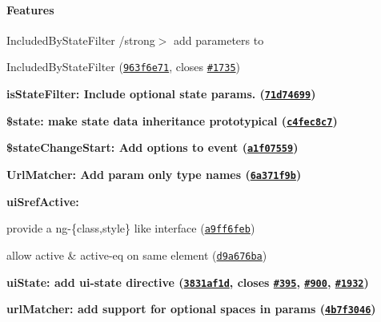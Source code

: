 {\bfseries {\bfseries \paragraph*{Features}}}

{\bfseries {\bfseries }}

{\bfseries {\bfseries 
\begin{DoxyItemize}
\item {\bfseries \begin{DoxyParagraph}{Included\+By\+State\+Filter}
/strong$>$ add parameters to 
\end{DoxyParagraph}
Included\+By\+State\+Filter (\href{https://github.com/angular-ui/ui-router/commit/963f6e71633b9c3a266f3991d79089b7d14786b4}{\tt 963f6e71}, closes \href{https://github.com/angular-ui/ui-router/issues/1735}{\tt \#1735})}
\item {\bfseries {\bfseries is\+State\+Filter\+:} Include optional state params. (\href{https://github.com/angular-ui/ui-router/commit/71d7469987ee9ca86a41c8c6393ccd5d8913c3d6}{\tt 71d74699})}
\item {\bfseries {\bfseries \$state\+:} make state data inheritance prototypical (\href{https://github.com/angular-ui/ui-router/commit/c4fec8c7998113902af4152d716c42dada6eb465}{\tt c4fec8c7})}
\item {\bfseries {\bfseries \$state\+Change\+Start\+:} Add options to event (\href{https://github.com/angular-ui/ui-router/commit/a1f07559ec74e10ff80bc4be81f287e3772b8fcb}{\tt a1f07559})}
\item {\bfseries {\bfseries Url\+Matcher\+:} Add param only type names (\href{https://github.com/angular-ui/ui-router/commit/6a371f9b70e37a82eb324122879e4473c3f6d526}{\tt 6a371f9b})}
\item {\bfseries {\bfseries ui\+Sref\+Active\+:}
\begin{DoxyItemize}
\item provide a ng-\/\{class,style\} like interface (\href{https://github.com/angular-ui/ui-router/commit/a9ff6febb469e0d5cd49054216c4472df7a6259d}{\tt a9ff6feb})
\item allow active \& active-\/eq on same element (\href{https://github.com/angular-ui/ui-router/commit/d9a676ba2c4d9e954be224c60496bcb38f6074e3}{\tt d9a676ba})
\end{DoxyItemize}}
\item {\bfseries {\bfseries ui\+State\+:} add ui-\/state directive (\href{https://github.com/angular-ui/ui-router/commit/3831af1dc71b601351e6694af0665a77297f8f7f}{\tt 3831af1d}, closes \href{https://github.com/angular-ui/ui-router/issues/395}{\tt \#395}, \href{https://github.com/angular-ui/ui-router/issues/900}{\tt \#900}, \href{https://github.com/angular-ui/ui-router/issues/1932}{\tt \#1932})}
\item {\bfseries {\bfseries url\+Matcher\+:} add support for optional spaces in params (\href{https://github.com/angular-ui/ui-router/commit/4b7f304617f0b3590b532103b5c2fb526c98a9e4}{\tt 4b7f3046})}
\end{DoxyItemize}}}

